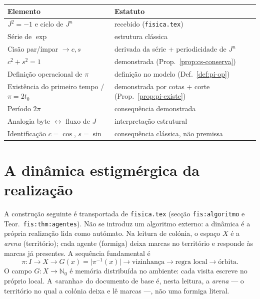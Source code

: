 \documentclass[11pt,a4paper]{article}
\begin{document}
\begin{center}
\small
\begin{tabular}{@{}p{}p{}@{}}
\toprule
Elemento & Estatuto \\
\midrule
\(J^2=-1\) e ciclo de \(J^n\) & recebido (\texttt{fisica.tex}) \\
Série de \(\exp\) & estrutura clássica \\
Cisão par/ímpar \(\to c,s\) & derivada da série + periodicidade de \(J^n\) \\
\(c^2+s^2=1\) & demonstrada (Prop.~\ref{prop:cs-conserva}) \\
Definição operacional de \(\pi\) & definição no modelo (Def.~\ref{def:pi-op}) \\
Existência do primeiro tempo / \(\pi=2t_0\) & demonstrada por cotas + corte (Prop.~\ref{prop:pi-existe}) \\
Período \(2\pi\) & consequência demonstrada \\
Analogia byte \(\leftrightarrow\) fluxo de \(J\) & interpretação estrutural \\
Identificação \(c=\cos\), \(s=\sin\) & consequência clássica, não premissa \\
\bottomrule
\end{tabular}
\end{center}

\section{A dinâmica estigmérgica da realização}
\label{sec:aranha-estigmergica}

A construção seguinte é transportada de \texttt{fisica.tex} (secção \texttt{fis:algoritmo} e Teor.\ \texttt{fis:thm:agentes}). Não se introduz um algoritmo externo: a dinâmica é a própria realização lida como autómato. Na leitura de colónia, o espaço \(X\) é a \emph{arena} (território); cada agente (formiga) deixa marcas no território e responde às marcas já presentes. A sequência fundamental é
\[
\pi\colon I\to X
\longrightarrow
G(x)=\lvert\pi^{-1}(x)\rvert
\longrightarrow
\text{vizinhança}
\longrightarrow
\text{regra local}
\longrightarrow
\text{órbita}.
\]
O campo \(G\colon X\to\mathbb N_0\) é memória distribuída no ambiente: cada visita escreve no próprio local. A «aranha» do documento de base é, nesta leitura, a \emph{arena} --- o território no qual a colónia deixa e lê marcas ---, não uma formiga literal.
\end{document}
